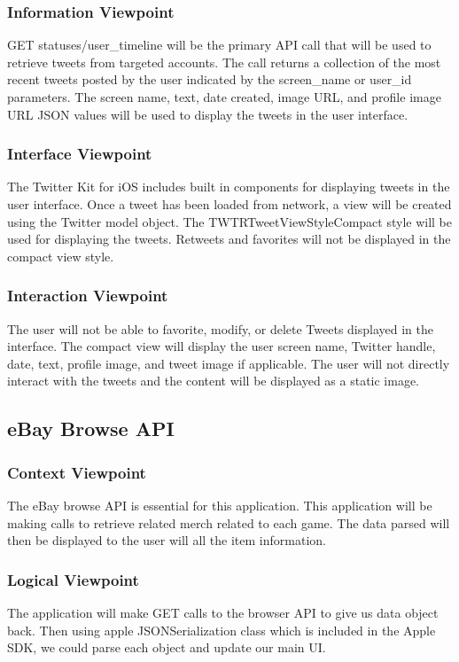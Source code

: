 \documentclass[onecolumn, draftclsnofoot,10pt, compsoc]{IEEEtran}
\begin{document}
\subsubsection{Information Viewpoint}
GET statuses/user\_timeline will be the primary API call that will be used to retrieve tweets from targeted accounts. 
The call returns a collection of the most recent tweets posted by the user indicated by the screen\_name or user\_id parameters. 
The screen name, text, date created, image URL, and profile image URL JSON values will be used to display the tweets in the user interface. 
\subsubsection{Interface Viewpoint}
The Twitter Kit for iOS includes built in components for displaying tweets in the user interface. 
Once a tweet has been loaded from network, a view will be created using the Twitter model object.
The TWTRTweetViewStyleCompact style will be used for displaying the tweets.
Retweets and favorites will not be displayed in the compact view style. 
\subsubsection{Interaction Viewpoint}
The user will not be able to favorite, modify, or delete Tweets displayed in the interface.
The compact view will display the user screen name, Twitter handle, date, text, profile image, and tweet image if applicable. The user will not directly interact with the tweets and the content will be displayed as a static image. 

\subsection{eBay Browse API}
\subsubsection{Context Viewpoint}
The eBay browse API is essential for this application. This application will be making calls to retrieve related merch related to each game. The data parsed will then be displayed to the user will all the item information. 

\subsubsection{Logical Viewpoint}
The application will make GET calls to the browser API to give us data object back. Then using apple JSONSerialization class which is included in the Apple SDK, we could parse each object and update our main UI. 
\end{document}
